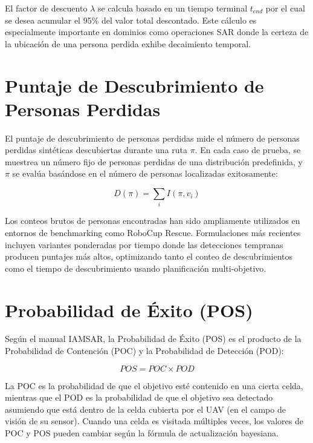 \documentclass[12pt]{report} %
\begin{document}
El factor de descuento $\lambda$ se calcula basado en un tiempo terminal $t_{end}$ por el cual se desea acumular el 95\% del valor total descontado. Este cálculo es especialmente importante en dominios como operaciones SAR donde la certeza de la ubicación de una persona perdida exhibe decaimiento temporal.

\section{Puntaje de Descubrimiento de Personas Perdidas}

El puntaje de descubrimiento de personas perdidas mide el número de personas perdidas sintéticas descubiertas durante una ruta $\pi$. En cada caso de prueba, se muestrea un número fijo de personas perdidas de una distribución predefinida, y $\pi$ se evalúa basándose en el número de personas localizadas exitosamente:

\begin{equation}
D(\pi) = \sum_{i} I(\pi, v_i)
\end{equation}

Los conteos brutos de personas encontradas han sido ampliamente utilizados en entornos de benchmarking como RoboCup Rescue\cite{kohlbrecher2015}. Formulaciones más recientes incluyen variantes ponderadas por tiempo donde las detecciones tempranas producen puntajes más altos, optimizando tanto el conteo de descubrimientos como el tiempo de descubrimiento usando planificación multi-objetivo\cite{trojanowski2024}.

\section{Probabilidad de Éxito (POS)}

Según el manual IAMSAR, la Probabilidad de Éxito (POS) es el producto de la Probabilidad de Contención (POC) y la Probabilidad de Detección (POD):

\begin{equation}
POS = POC \times POD
\end{equation}

La POC es la probabilidad de que el objetivo esté contenido en una cierta celda, mientras que el POD es la probabilidad de que el objetivo sea detectado asumiendo que está dentro de la celda cubierta por el UAV (en el campo de visión de su sensor). Cuando una celda es visitada múltiples veces, los valores de POC y POS pueden cambiar según la fórmula de actualización bayesiana\cite{koopman1980, stone2006}.
\end{document}
